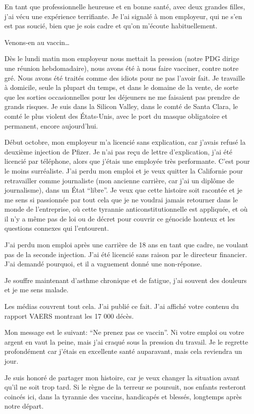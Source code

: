 {En tant que professionnelle heureuse et en bonne santé, avec deux grandes
filles, j'ai vécu une expérience terrifiante. Je l'ai signalé à mon employeur,
qui ne s'en est pas soucié, bien que je sois cadre et qu'on m'écoute
habituellement.

Venons-en au vaccin…

Dès le lundi matin mon employeur nous mettait la pression (notre PDG dirige une
réunion hebdomadaire), nous avons été à nous faire vacciner, contre notre
gré. Nous avons été traités comme des idiots pour ne pas l'avoir fait. Je
travaille à domicile, seule la plupart du temps, et dans le domaine de la vente,
de sorte que les sorties occasionnelles pour les déjeuners ne me faisaient pas
prendre de grands risques. Je suis dans la Silicon Valley, dans le comté de
Santa Clara, le comté le plus violent des États-Unis, avec le port du masque
obligatoire et permanent, encore aujourd'hui.

Début octobre, mon employeur m'a licencié sans explication, car j'avais refusé
la deuxième injection de Pfizer. Je n'ai pas reçu de lettre d'explication, j'ai
été licencié par téléphone, alors que j'étais une employée très
performante. C'est pour le moins surréaliste. J'ai perdu mon emploi et je veux
quitter la Californie pour retravailler comme journaliste (mon ancienne
carrière, car j'ai un diplôme de journalisme), dans un État “libre”. Je veux que
cette histoire soit racontée et je me sens si passionnée par tout cela que je ne
voudrai jamais retourner dans le monde de l'entreprise, où cette tyrannie
anticonstitutionnelle est appliquée, et où il n'y a même pas de loi ou de décret
pour couvrir ce génocide honteux et les questions connexes qui l'entourent.

J'ai perdu mon emploi après une carrière de 18 ans en tant que cadre, ne voulant
pas de la seconde injection. J'ai été licencié sans raison par le directeur
financier. J'ai demandé pourquoi, et il a vaguement donné une non-réponse.

Je souffre maintenant d'asthme chronique et de fatigue, j'ai souvent des
douleurs et je me sens malade.

Les médias couvrent tout cela. J'ai publié ce fait. J'ai affiché votre contenu
du rapport VAERS montrant les 17 000 décès.

Mon message est le suivant: “Ne prenez pas ce vaccin”. Ni votre emploi ou votre
argent en vaut la peine, mais j'ai craqué sous la pression du travail. Je le
regrette profondément car j'étais en excellente santé auparavant, mais cela
reviendra un jour.

Je suis honoré de partager mon histoire, car je veux changer la situation avant
qu'il ne soit trop tard. Si le règne de la terreur se poursuit, nos enfants
resteront coincés ici, dans la tyrannie des vaccins, handicapés et blessés,
longtemps après notre départ.

}
